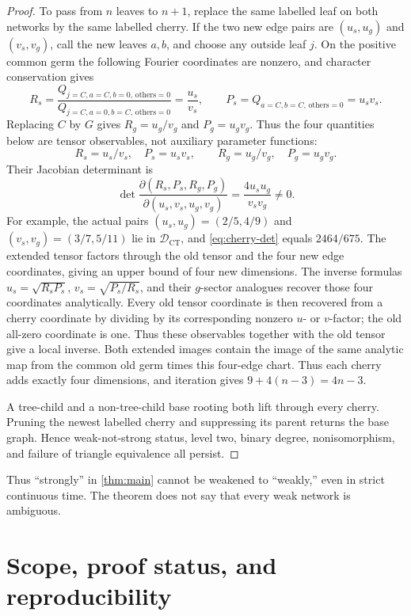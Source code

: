 \documentclass[11pt]{article}
\theoremstyle{remark}
\newcommand{\Dct}{\mathcal D_{\mathrm{CT}}}
\newcommand{\1}{\mathbf 1}
\begin{document}
\begin{proof}
To pass from \(n\) leaves to \(n+1\), replace the same labelled leaf on both
networks by the same labelled cherry.  If the two new edge pairs are
\((u_s,u_g)\) and \((v_s,v_g)\), call the new leaves \(a,b\), and choose any
outside leaf \(j\).  On the positive common germ the following Fourier
coordinates are nonzero, and character conservation gives
\[
 R_s=
 \frac{Q_{j=C,a=C,b=0,\,\mathrm{others}=0}}
      {Q_{j=C,a=0,b=C,\,\mathrm{others}=0}}
 =\frac{u_s}{v_s},
 \qquad
 P_s=Q_{a=C,b=C,\,\mathrm{others}=0}=u_sv_s.
\]
Replacing \(C\) by \(G\) gives \(R_g=u_g/v_g\) and \(P_g=u_gv_g\).
Thus the four quantities below are tensor observables, not auxiliary
parameter functions:
\[
 R_s=u_s/v_s,\quad P_s=u_sv_s,\qquad
 R_g=u_g/v_g,\quad P_g=u_gv_g.
\]
Their Jacobian determinant is
\begin{equation}\label{eq:cherry-det}
 \det\frac{\partial(R_s,P_s,R_g,P_g)}
 {\partial(u_s,v_s,u_g,v_g)}
 =\frac{4u_su_g}{v_sv_g}\ne0.
\end{equation}
For example, the actual pairs
\((u_s,u_g)=(2/5,4/9)\) and
\((v_s,v_g)=(3/7,5/11)\) lie in \(\Dct\), and
\eqref{eq:cherry-det} equals \(2464/675\).  The extended tensor factors
through the old tensor and the four new edge coordinates, giving an upper
bound of four new dimensions.  The inverse formulas
\(u_s=\sqrt{R_sP_s}\), \(v_s=\sqrt{P_s/R_s}\), and their \(g\)-sector
analogues recover those four coordinates analytically.  Every old tensor
coordinate is then recovered from a cherry coordinate by dividing by its
corresponding nonzero \(u\)- or \(v\)-factor; the old all-zero coordinate is
one.  Thus these observables together with the old tensor give a local
inverse.  Both extended images contain the image of the same analytic map
from the common old germ times this four-edge chart.  Thus each cherry adds
exactly four dimensions, and iteration gives
\(9+4(n-3)=4n-3\).

A tree-child and a non-tree-child base rooting both lift through every cherry.
Pruning the newest labelled cherry and suppressing its parent returns the base
graph.  Hence weak-not-strong status, level two, binary degree, nonisomorphism,
and failure of triangle equivalence all persist.
\end{proof}

Thus ``strongly'' in \cref{thm:main} cannot be weakened to ``weakly,'' even in
strict continuous time.  The theorem does not say that every weak network is
ambiguous.

\section{Scope, proof status, and reproducibility}\label{sec:status}
\end{document}
